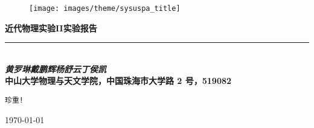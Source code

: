 
\begin{titlepage}
	\parindent=0pt
	
	\hspace*{\fill} %
	
	\vspace{2em} %
	
	\begin{figure}[h!]
		\centering
		\texttt{[image: images/theme/sysuspa\_title]}
	\end{figure}
	
	
	\vspace{5em} %
	
	\begin{flushright}
		{ \Huge \bfseries 近代物理实验II实验报告} \hspace*{6em} \\[0.2cm]
		\rule{0.618\textwidth}{5pt} \hspace*{6em} \\[0.4cm]
		
		\LARGE\emph{\textbf{黄罗琳\quad 戴鹏辉\quad 杨舒云\quad 丁侯凯}} \hspace*{4.1em}	\\[0.7cm]
		
		\large\textbf{中山大学物理与天文学院，中国珠海市大学路 2 号，519082} \hspace*{5em}
		
	\end{flushright}
	
	\begin{center}
		\vfill
		
		\Large\texttt{\textcolor{fgrayblue}{\kaishu 珍重!}} %
		
		\hspace*{\fill}
		
		{\LARGE \today}
		
		\hspace*{\fill}
	\end{center}
	
\end{titlepage}